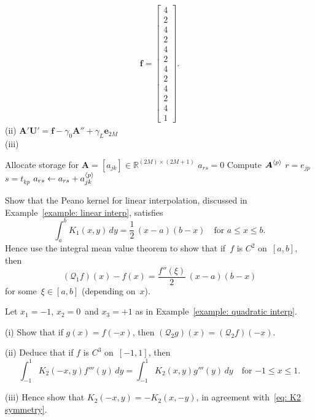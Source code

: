 \begin{Exercises}
\begin{ans}
\begin{gather*}
\boldsymbol{f}=\left[\begin{array}{c}
4\\ 2\\ 4\\ 2\\ 4\\ 2\\ 4\\ 2\\ 4\\ 2\\ 4\\ 1
\end{array}\right].
\end{gather*}
(ii) $\boldsymbol{A}'\boldsymbol{U}'=\boldsymbol{f}-\gamma_0\boldsymbol{A}''
+\gamma_L\boldsymbol{e}_{2M}$\\
(iii)
\begin{algorithmic}
\State Allocate storage for 
$\boldsymbol{A}=[a_{jk}]\in\mathbb{R}^{(2M)\times(2M+1)}$ 
        \State $a_{rs}=0$ 
    \EndFor
\EndFor
{}
    \State Compute $\boldsymbol{A}^{\langle p\rangle}$ 
        \State $r=e_{jp}$
                \State $s=t_{kp}$
                \State $a_{rs}\gets a_{rs}+a^{\langle p\rangle}_{jk}$
            \EndFor
        \EndIf
    \EndFor
\EndFor
\end{algorithmic}
\end{ans}

\exercise
Show that the Peano kernel for linear interpolation, discussed in 
Example~\ref{example: linear interp}, satisfies
\[
\int_a^b K_1(x,y)\,dy=\frac{1}{2}\,(x-a)(b-x)\quad\text{for $a\le x\le b$.}
\]
Hence use the integral mean value theorem to show that if~$f$ is $C^2$ 
on~$[a,b]$, then 
\[
(\mathcal{Q}_1f)(x)-f(x)=\frac{f''(\xi)}{2}\,(x-a)(b-x)
\]
for some~$\xi\in[a,b]$ (depending on~$x$).

\exercise
Let $x_1=-1$, $x_2=0$~and $x_3=+1$ as in 
Example~\ref{example: quadratic interp}.  
\begin{description}
\item{(i)} Show that if $g(x)=f(-x)$, then 
$(\mathcal{Q}_2g)(x)=(\mathcal{Q}_2f)(-x)$.
\item{(ii)} Deduce that if $f$ is $C^3$ on~$[-1,1]$, then
\[
\int_{-1}^1K_2(-x,y)f'''(y)\,dy=\int_{-1}^1K_2(x,y)g'''(y)\,dy
	\quad\text{for $-1\le x\le 1$.}
\]
\item{(iii)} Hence show that $K_2(-x,y)=-K_2(x,-y)$, in agreement 
with~\eqref{eq: K2 symmetry}.
\end{description}


\end{Exercises}
